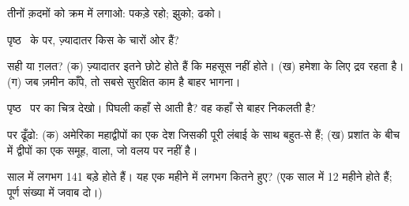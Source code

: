 \begin{exercise}[$\star$]\label{exo:g4:volcanoes-earthquakes-first-look:3}
तीनों क़दमों को क्रम में लगाओ: पकड़े रहो; झुको; ढको।
\end{exercise}

\begin{exercise}[$\star$]\label{exo:g4:volcanoes-earthquakes-first-look:4}
पृष्ठ~\pageref{fig:g4:volcanoes-earthquakes-first-look:map} के  पर, ज़्यादातर
 किस  के चारों ओर हैं?
\end{exercise}

\begin{exercise}[$\star$]\label{exo:g4:volcanoes-earthquakes-first-look:5}
सही या ग़लत? (क) ज़्यादातर  इतने छोटे होते हैं कि महसूस नहीं होते। (ख) 
हमेशा के लिए द्रव रहता है। (ग) जब ज़मीन काँपे, तो सबसे सुरक्षित काम है बाहर
भागना।
\end{exercise}

\begin{exercise}[$\star$]\label{exo:g4:volcanoes-earthquakes-first-look:6}
पृष्ठ~\pageref{fig:g4:volcanoes-earthquakes-first-look:volcano} पर  का चित्र देखो।
पिघली  कहाँ से आती है? वह कहाँ से बाहर निकलती है?
\end{exercise}

\begin{exercise}[$\star\star$]\label{exo:g4:volcanoes-earthquakes-first-look:7}
 पर ढूँढो: (क) अमेरिका महाद्वीपों का एक देश जिसकी पूरी लंबाई के साथ
बहुत-से  हैं; (ख) प्रशांत  के बीच में द्वीपों का एक समूह,
 वाला, जो वलय पर नहीं है।
\end{exercise}

\begin{exercise}[$\star\star$]\label{exo:g4:volcanoes-earthquakes-first-look:8}
साल में लगभग 141 बड़े  होते हैं। यह एक महीने में लगभग कितने हुए? (एक साल में
12 महीने होते हैं; पूर्ण संख्या में जवाब दो।)
\end{exercise}

